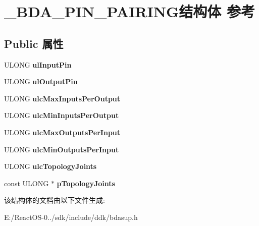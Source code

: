\hypertarget{struct___b_d_a___p_i_n___p_a_i_r_i_n_g}{}\section{\+\_\+\+B\+D\+A\+\_\+\+P\+I\+N\+\_\+\+P\+A\+I\+R\+I\+N\+G结构体 参考}
\label{struct___b_d_a___p_i_n___p_a_i_r_i_n_g}
\subsection*{Public 属性}
\begin{DoxyCompactItemize}
\item 
\mbox{\label{struct___b_d_a___p_i_n___p_a_i_r_i_n_g_ae2857eee9d321dda4eb9cc4fa66edd40}} 
U\+L\+O\+NG {\bfseries ul\+Input\+Pin}
\item 
\mbox{\label{struct___b_d_a___p_i_n___p_a_i_r_i_n_g_aeedf862a0302fd1f296a6241f6a0c9d6}} 
U\+L\+O\+NG {\bfseries ul\+Output\+Pin}
\item 
\mbox{\label{struct___b_d_a___p_i_n___p_a_i_r_i_n_g_ae6e3caecc9f5dfada10e2aa0d5f7a56b}} 
U\+L\+O\+NG {\bfseries ulc\+Max\+Inputs\+Per\+Output}
\item 
\mbox{\label{struct___b_d_a___p_i_n___p_a_i_r_i_n_g_ab068ffe2942767b33bb33de5307bceed}} 
U\+L\+O\+NG {\bfseries ulc\+Min\+Inputs\+Per\+Output}
\item 
\mbox{\label{struct___b_d_a___p_i_n___p_a_i_r_i_n_g_ad4bc8cbd26d19a6b6f72202a6d9695d9}} 
U\+L\+O\+NG {\bfseries ulc\+Max\+Outputs\+Per\+Input}
\item 
\mbox{\label{struct___b_d_a___p_i_n___p_a_i_r_i_n_g_a9433e79eea79cbd8f267bdd857fe2365}} 
U\+L\+O\+NG {\bfseries ulc\+Min\+Outputs\+Per\+Input}
\item 
\mbox{\label{struct___b_d_a___p_i_n___p_a_i_r_i_n_g_a3c3026b39db908477c532ad04cfa02fe}} 
U\+L\+O\+NG {\bfseries ulc\+Topology\+Joints}
\item 
\mbox{\label{struct___b_d_a___p_i_n___p_a_i_r_i_n_g_a0c633c36e9df91afc4f1b8fb310b3b8c}} 
const U\+L\+O\+NG $\ast$ {\bfseries p\+Topology\+Joints}
\end{DoxyCompactItemize}


该结构体的文档由以下文件生成\+:\begin{DoxyCompactItemize}
\item 
E\+:/\+React\+O\+S-\/0../sdk/include/ddk/bdasup.\+h\end{DoxyCompactItemize}
